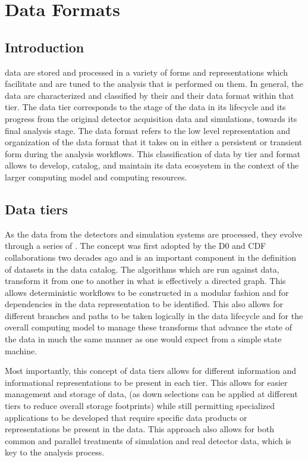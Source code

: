 \documentclass[../main-v1.tex]{subfiles}
\begin{document}
\chapter{Data Formats}
\label{ch:format}

\section{Introduction } 

 data are stored and processed in a variety of forms and representations which facilitate and are tuned to the analysis that is performed on them.
In general, %
the data are characterized and classified by their  and their data format within that tier.  The data tier corresponds to the stage of the data in its lifecycle and its progress from the original detector acquisition data and simulations, towards its final analysis stage.  The data format refers to the low level representation and organization of the data format that it takes on in either a persistent or transient form during the analysis workflows.  This classification of data by tier and format allows  to develop, catalog, and maintain its data ecosystem in the context of the larger computing model and computing resources.


\section{Data tiers }

As the data from the  detectors and simulation systems are processed, they evolve through a series of .  The  concept was first adopted by the D0 and CDF collaborations two decades ago and is an important component in the definition of datasets in the data catalog.
The algorithms which are run against data, transform it from one  to another in what is effectively a directed graph.  This allows deterministic workflows to be constructed in a modular fashion and for dependencies in the data representation to be identified.  This also allows for different branches and paths to be taken logically in the data lifecycle and for the overall computing model to manage these transforms that advance the state of the data in much the same manner as one would expect from a simple state machine.

Most importantly, this concept of data tiers allows for different information and informational representations to be present in each tier.  This allows for easier management and storage of data, (as down selections can be applied at different tiers to reduce overall storage footprints) while still permitting specialized applications to be developed that require specific data products or representations be present in the data. %
This approach also allows for both common and parallel treatments of simulation and real detector data, which is key to the analysis process. 
\end{document}
